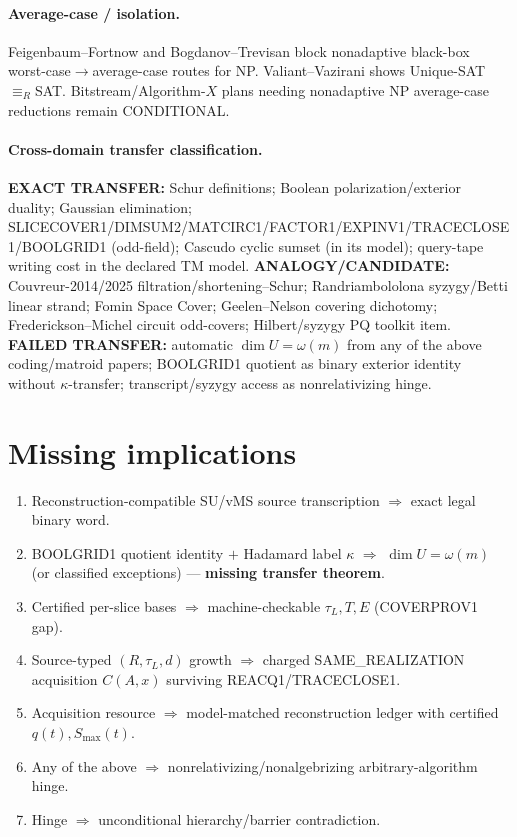 \documentclass[11pt]{article}
\begin{document}
\paragraph{Average-case / isolation.}
Feigenbaum--Fortnow and Bogdanov--Trevisan block nonadaptive black-box worst-case$\to$average-case
routes for NP. Valiant--Vazirani shows Unique-SAT$\equiv_R$SAT. Bitstream/Algorithm-$X$ plans
needing nonadaptive NP average-case reductions remain CONDITIONAL.
\paragraph{Cross-domain transfer classification.}
\textbf{EXACT TRANSFER:} Schur definitions; Boolean polarization/exterior duality; Gaussian
elimination; SLICECOVER1/DIMSUM2/MATCIRC1/FACTOR1/EXPINV1/TRACECLOSE1/BOOLGRID1 (odd-field);
Cascudo cyclic sumset (in its model); query-tape writing cost in the declared TM model.
\textbf{ANALOGY/CANDIDATE:} Couvreur-2014/2025 filtration/shortening--Schur; Randriambololona
syzygy/Betti linear strand; Fomin Space Cover; Geelen--Nelson covering dichotomy;
Frederickson--Michel circuit odd-covers; Hilbert/syzygy PQ toolkit item.
\textbf{FAILED TRANSFER:} automatic $\dim U=\omega(m)$ from any of the above coding/matroid
papers; BOOLGRID1 quotient as binary exterior identity without $\kappa$-transfer;
transcript/syzygy access as nonrelativizing hinge.

\section*{Missing implications}
\begin{enumerate}
\item Reconstruction-compatible SU/vMS source transcription $\Rightarrow$ exact legal binary word.
\item BOOLGRID1 quotient identity $+$ Hadamard label $\kappa$ $\Rightarrow$
$\dim U=\omega(m)$ (or classified exceptions) --- \textbf{missing transfer theorem}.
\item Certified per-slice bases $\Rightarrow$ machine-checkable $\tau_L,T,E$ (COVERPROV1 gap).
\item Source-typed $(R,\tau_L,d)$ growth $\Rightarrow$ charged SAME\_REALIZATION acquisition
$C(A,x)$ surviving REACQ1/TRACECLOSE1.
\item Acquisition resource $\Rightarrow$ model-matched reconstruction ledger with certified
$q(t),S_{\max}(t)$.
\item Any of the above $\Rightarrow$ nonrelativizing/nonalgebrizing arbitrary-algorithm hinge.
\item Hinge $\Rightarrow$ unconditional hierarchy/barrier contradiction.
\end{enumerate}
\end{document}
